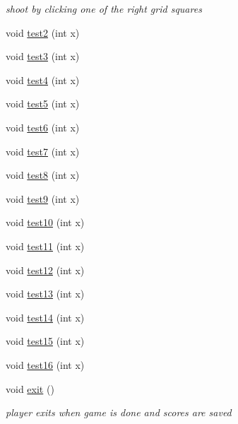 \begin{DoxyCompactItemize}
\begin{DoxyCompactList}\small\item\em shoot by clicking one of the right grid squares \end{DoxyCompactList}\item 
void \hyperlink{classbattleshipgame_a1f6ca1a66e975c0e9785278a2e6d92b9}{test2} (int x)
\item 
void \hyperlink{classbattleshipgame_a58028520908b9161db6158aa3478f00c}{test3} (int x)
\item 
void \hyperlink{classbattleshipgame_a9176cadc06e920eb0aba9679f49e96ca}{test4} (int x)
\item 
void \hyperlink{classbattleshipgame_a0119d4f5935bdd98a5a974a4aa8bd5d0}{test5} (int x)
\item 
void \hyperlink{classbattleshipgame_a15ad12d526ba36f2b951aca9005ec6f6}{test6} (int x)
\item 
void \hyperlink{classbattleshipgame_a04531484e5ac0cb61328e6a07f6bbe3b}{test7} (int x)
\item 
void \hyperlink{classbattleshipgame_ad30b973cdaa9a48bea832d28e9c66a23}{test8} (int x)
\item 
void \hyperlink{classbattleshipgame_adcb72d849316cf91db67e2d40cf9757e}{test9} (int x)
\item 
void \hyperlink{classbattleshipgame_a894f81d8d9368923b8b6c49f373a916d}{test10} (int x)
\item 
void \hyperlink{classbattleshipgame_ac984d3cc5f2c495315f0e40b3386a170}{test11} (int x)
\item 
void \hyperlink{classbattleshipgame_a801729b71aadc28bf27a2cdf9863a0f2}{test12} (int x)
\item 
void \hyperlink{classbattleshipgame_a2b71aca6916fc24986574cc5282cc6b1}{test13} (int x)
\item 
void \hyperlink{classbattleshipgame_a038c75b53a7aeb63718718ddb474d6f9}{test14} (int x)
\item 
void \hyperlink{classbattleshipgame_a7d5c9884fcb1d37853a7e25438fe3bf3}{test15} (int x)
\item 
void \hyperlink{classbattleshipgame_a24b68bab1498b0d2841ca1e2127d81c7}{test16} (int x)
\item 
void \hyperlink{classbattleshipgame_a498809fd1ed17350a8d7a459bbf734ae}{exit} ()
\begin{DoxyCompactList}\small\item\em player exits when game is done and scores are saved \end{DoxyCompactList}\end{DoxyCompactItemize}
